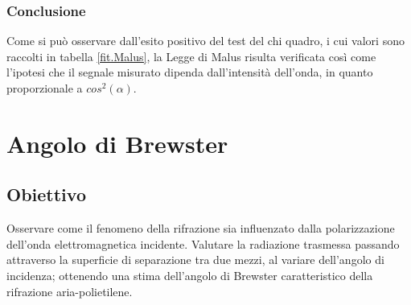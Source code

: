 \documentclass[a4paper]{article}
\begin{document}
\subsubsection{Conclusione}
Come si può osservare dall'esito positivo del test del chi quadro, i cui valori sono raccolti in tabella \ref{fit.Malus}, la Legge di Malus risulta verificata così come l'ipotesi che il segnale misurato dipenda dall'intensità dell'onda, in quanto proporzionale a $cos^2(\alpha)$.



\section{Angolo di Brewster}
\subsection{Obiettivo}
Osservare come il fenomeno della rifrazione sia influenzato dalla polarizzazione dell'onda elettromagnetica incidente. Valutare la radiazione trasmessa passando attraverso la superficie di separazione tra due mezzi, al variare dell'angolo di incidenza; ottenendo una stima dell'angolo di Brewster caratteristico della rifrazione aria-polietilene. 
\end{document}
